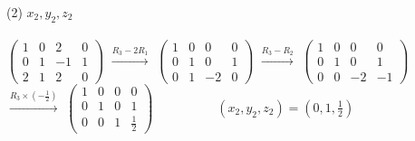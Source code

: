 \documentclass[fleqn]{jsarticle}
\begin{document}
\begin{description}
\begin{spacing}{1.2}
            \item[(2)]
                $ x_2, y_2, z_2 $ \\\\
                $ \left(
                    \begin{array}{ccc|c}
                        1 & 0 & 2 & 0 \\
                        0 & 1 & -1 & 1 \\
                        2 & 1 & 2 & 0
                    \end{array}
                \right) $
                $ \xrightarrow{R_3-2R_1} $
                $ \left(
                    \begin{array}{ccc|c}
                        1 & 0 & 0 & 0 \\
                        0 & 1 & 0 & 1 \\
                        0 & 1 & -2 & 0
                    \end{array}
                \right) $
                $ \xrightarrow{R_3-R_2} $
                $ \left(
                    \begin{array}{ccc|c}
                        1 & 0 & 0 & 0 \\
                        0 & 1 & 0 & 1 \\
                        0 & 0 & -2 & -1
                    \end{array}
                \right) $\\
                $ \xrightarrow{R_3\times(-\frac{1}{2})} $
                $ \left(
                    \begin{array}{ccc|c}
                        1 & 0 & 0 & 0 \\
                        0 & 1 & 0 & 1 \\
                        0 & 0 & 1 & \frac{1}{2}
                    \end{array}
                \right)
                \hspace{60pt}
                (x_2, y_2, z_2) = (0, 1, \frac{1}{2}) $

            \newpage


\end{spacing}
\end{description}
\end{document}
